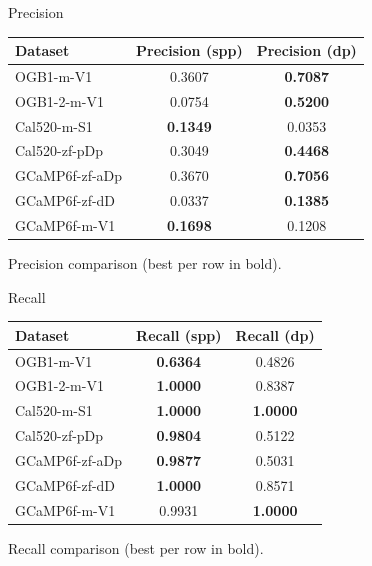 \documentclass[15pt]{beamer}
\theoremstyle{definition}
\begin{document}
%

\begin{frame}{Precision}
\centering
\begin{tabular}{lcc}
\hline
Dataset & Precision (spp) & Precision (dp) \\
\hline
OGB1-m-V1      & 0.3607 & \textbf{0.7087} \\
OGB1-2-m-V1    & 0.0754 & \textbf{0.5200} \\
Cal520-m-S1    & \textbf{0.1349} & 0.0353 \\
Cal520-zf-pDp  & 0.3049 & \textbf{0.4468} \\
GCaMP6f-zf-aDp & 0.3670 & \textbf{0.7056} \\
GCaMP6f-zf-dD  & 0.0337 & \textbf{0.1385} \\
GCaMP6f-m-V1   & \textbf{0.1698} & 0.1208 \\
\hline
\end{tabular}

\vspace{0.5em}
{\small Precision comparison (best per row in bold).}
\end{frame}

\begin{frame}{Recall}
\centering
\begin{tabular}{lcc}
\hline
Dataset & Recall (spp) & Recall (dp) \\
\hline
OGB1-m-V1      & \textbf{0.6364} & 0.4826 \\
OGB1-2-m-V1    & \textbf{1.0000} & 0.8387 \\
Cal520-m-S1    & \textbf{1.0000} & \textbf{1.0000} \\
Cal520-zf-pDp  & \textbf{0.9804} & 0.5122 \\
GCaMP6f-zf-aDp & \textbf{0.9877} & 0.5031 \\
GCaMP6f-zf-dD  & \textbf{1.0000} & 0.8571 \\
GCaMP6f-m-V1   & 0.9931 & \textbf{1.0000} \\
\hline
\end{tabular}

\vspace{0.5em}
{\small Recall comparison (best per row in bold).}
\end{frame}
\end{document}

